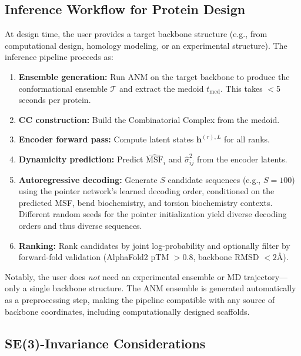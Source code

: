 \documentclass{article}
\begin{document}
\subsection{Inference Workflow for Protein Design}

At design time, the user provides a target backbone structure (e.g., from computational design, homology modeling, or an experimental structure). The inference pipeline proceeds as:
\begin{enumerate}
    \item \textbf{Ensemble generation:} Run ANM on the target backbone to produce the conformational ensemble $\mathcal{T}$ and extract the medoid $t_{\text{med}}$. This takes $<$5 seconds per protein.
    \item \textbf{CC construction:} Build the Combinatorial Complex from the medoid.
    \item \textbf{Encoder forward pass:} Compute latent states $\mathbf{h}^{(r),L}$ for all ranks.
    \item \textbf{Dynamicity prediction:} Predict $\widehat{\text{MSF}}_i$ and $\hat{\sigma}^2_{ij}$ from the encoder latents.
    \item \textbf{Autoregressive decoding:} Generate $S$ candidate sequences (e.g., $S = 100$) using the pointer network's learned decoding order, conditioned on the predicted MSF, bend biochemistry, and torsion biochemistry contexts. Different random seeds for the pointer initialization yield diverse decoding orders and thus diverse sequences.
    \item \textbf{Ranking:} Rank candidates by joint log-probability and optionally filter by forward-fold validation (AlphaFold2 pTM $> 0.8$, backbone RMSD $< 2$\AA).
\end{enumerate}
Notably, the user does \emph{not} need an experimental ensemble or MD trajectory---only a single backbone structure. The ANM ensemble is generated automatically as a preprocessing step, making the pipeline compatible with any source of backbone coordinates, including computationally designed scaffolds.

\subsection{SE(3)-Invariance Considerations}
\end{document}
